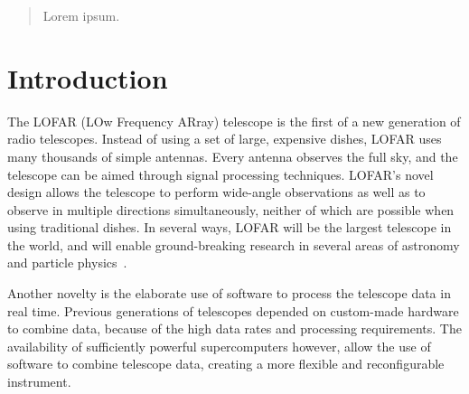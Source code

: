 \documentclass{llncs}
\begin{document}
\newcommand{\comment}[1]{}

\begin{abstract}
Lorem ipsum.
\end{abstract}
\section{Introduction}

\comment{
  EUROPAR 2011:
    - abstract 24 jan
    - deadline 31 jan
    - 12 pagina's LNCS, incl broncode
}

\comment{
lofar:
  - overview
  - #stations
  - data rates

pulsar pipeline:  
  - new astronomical opportunities:
        - dynamic focus -> hundreds of simultaenous observations, which regular dishes must do sequentially
        - broad sky view -> surveys
        - extremely high data rates (up to 200 Gbit/s in, 18 Gbit/s out)
                - disks limits output rate, to be raised to 80Gbit/s out.

==> power of parallel machines + flexibility of software = powerful telescope                

software correlator benefits:
  the- flexibility
  - fast rollout of experimental features
  - easy bugfixing
  - high level programming -> advanced and complex features

}

The LOFAR (LOw Frequency ARray) telescope is the first of a new generation of radio telescopes. Instead of using a set of large, expensive dishes, LOFAR uses many thousands of simple antennas. Every antenna observes the full sky, and the telescope can be aimed through signal processing techniques. LOFAR's novel design allows the telescope to perform wide-angle observations as well as to observe in multiple directions simultaneously, neither of which are possible when using traditional dishes. In several ways, LOFAR will be the largest telescope in the world, and will enable ground-breaking research in several areas of astronomy and particle physics~\cite{Bruyn:02}.

Another novelty is the elaborate use of software to process the telescope data in real time. Previous generations of telescopes depended on custom-made hardware to combine data, because of the high data rates and processing requirements. The availability of sufficiently powerful supercomputers however, allow the use of software to combine telescope data, creating a more flexible and reconfigurable instrument.
\end{document}
